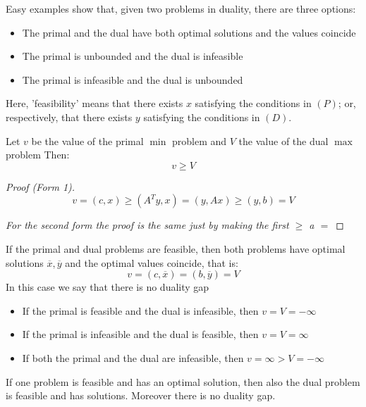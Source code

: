 \documentclass[../main.tex]{subfiles}
\begin{document}
Easy examples show that, given two problems in duality, there are three options:
\begin{itemize}
    \item The primal and the dual have both optimal solutions and the values coincide
    \item The primal is unbounded and the dual is infeasible
    \item The primal is infeasible and the dual is unbounded
\end{itemize}
Here, 'feasibility' means that there exists $x$ satisfying the conditions in $(P)$; or, respectively, that there exists $y$ satisfying the conditions in $(D)$.

\begin{theorem}
    Let $v$ be the value of the primal $\min$ problem and $V$ the value of the dual $\max$ problem Then:
    \[
        v \geq V
    \]
\end{theorem}

\begin{proof}[Proof (Form 1)]
    \[
        v = (c,x) \geq (A^T y, x) = (y, Ax) \geq (y,b) = V
    \]

    \textit{For the second form the proof is the same just by making the first $\geq$ a $=$}
\end{proof}

\begin{theorem}
    If the primal and dual problems are feasible, then both problems have optimal solutions $\overline{x}, \overline{y}$ and the optimal values coincide, that is:
    \[
        v = (c, \overline{x}) = (b, \overline{y}) = V
    \]
    In this case we say that there is no duality gap

    \begin{itemize}
        \item If the primal is feasible and the dual is infeasible, then $v = V = -\infty$
        \item If the primal is infeasible and the dual is feasible, then $v = V = \infty$
        \item If both the primal and the dual are infeasible, then $v = \infty > V = -\infty$
    \end{itemize}
\end{theorem}
\begin{corollary}
    If one problem is feasible and has an optimal solution, then also the dual problem is feasible and has solutions. Moreover there is no duality gap.
\end{corollary}
\end{document}
